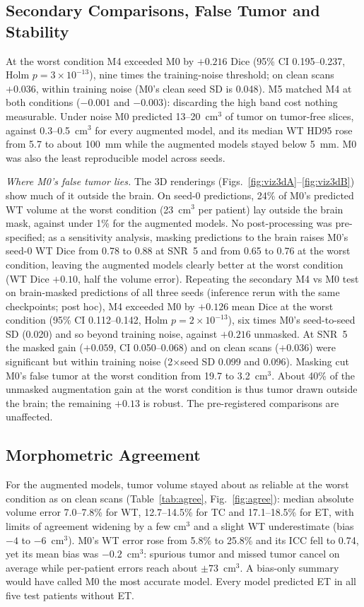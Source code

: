 \documentclass[conference]{IEEEtran}
\begin{document}
\subsection{Secondary Comparisons, False Tumor and Stability}
At the worst condition M4 exceeded M0 by $+0.216$ Dice (95\% CI 0.195--0.237, Holm $p = 3\times10^{-13}$),
nine times the training-noise threshold; on clean scans $+0.036$, within training noise (M0's clean seed SD is
0.048). M5 matched M4 at both conditions ($-0.001$ and $-0.003$): discarding the high band cost nothing
measurable. Under noise M0 predicted 13--20~cm$^3$ of tumor on tumor-free slices, against 0.3--0.5~cm$^3$ for
every augmented model, and its median WT HD95 rose from 5.7 to about 100~mm while the augmented models stayed
below 5~mm. M0 was also the least reproducible model across seeds.

\textit{Where M0's false tumor lies.} The 3D renderings (Figs.~\ref{fig:viz3dA}--\ref{fig:viz3dB}) show much of
it outside the brain. On seed-0 predictions, 24\% of M0's predicted WT volume at the worst condition (23~cm$^3$
per patient) lay outside the brain mask, against under 1\% for the augmented models. No post-processing was
pre-specified; as a sensitivity analysis, masking predictions to the brain raises M0's seed-0 WT Dice from 0.78
to 0.88 at SNR~5 and from 0.65 to 0.76 at the worst condition, leaving the augmented models clearly better at the
worst condition (WT Dice $+0.10$, half the volume error). Repeating the secondary M4 vs M0 test on
brain-masked predictions of all three seeds (inference rerun with the same checkpoints; post hoc), M4
exceeded M0 by $+0.126$ mean Dice at the worst condition (95\% CI 0.112--0.142, Holm $p = 2\times10^{-13}$),
six times M0's seed-to-seed SD (0.020) and so beyond training noise, against $+0.216$ unmasked. At SNR~5 the
masked gain ($+0.059$, CI 0.050--0.068) and on clean scans ($+0.036$) were significant but within training
noise (2$\times$seed SD 0.099 and 0.096). Masking cut M0's false tumor at the worst condition from 19.7 to
3.2~cm$^3$. About 40\% of the unmasked augmentation gain at the worst condition is thus tumor drawn outside the
brain; the remaining $+0.13$ is robust. The pre-registered comparisons are unaffected.

\subsection{Morphometric Agreement}
For the augmented models, tumor volume stayed about as reliable at the worst condition as on clean scans
(Table~\ref{tab:agree}, Fig.~\ref{fig:agree}): median absolute volume error 7.0--7.8\% for WT, 12.7--14.5\% for
TC and 17.1--18.5\% for ET, with limits of agreement widening by a few cm$^3$ and a slight WT underestimate
(bias $-4$ to $-6$~cm$^3$). M0's WT error rose from 5.8\% to 25.8\% and its ICC fell to 0.74, yet its mean bias
was $-0.2$~cm$^3$: spurious tumor and missed tumor cancel on average while per-patient errors reach about
$\pm73$~cm$^3$. A bias-only summary would have called M0 the most accurate model. Every model predicted ET in all
five test patients without ET.
\end{document}

